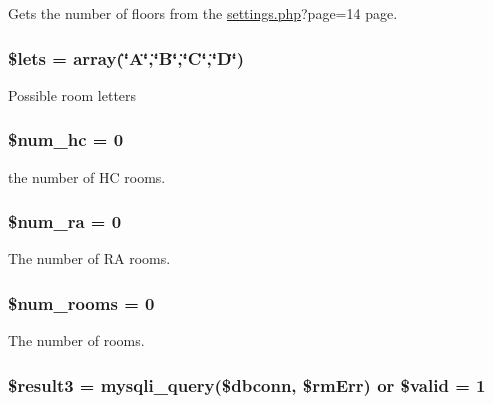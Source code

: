 \-Gets the number of floors from the \hyperlink{settings_8php}{settings.\-php}?page=14 page. \hypertarget{roomsVal_8php_a628d739f2a9b4e8ad7b45417ca5b0edd}{
\subsubsection[{\$lets}]{\setlength{\rightskip}{0pt plus 5cm}\$lets = array(\char`\"{}\-A\char`\"{},\char`\"{}\-B\char`\"{},\char`\"{}\-C\char`\"{},\char`\"{}\-D\char`\"{})}}\label{roomsVal_8php_a628d739f2a9b4e8ad7b45417ca5b0edd}
\-Possible room letters \hypertarget{roomsVal_8php_a0676c3aab4512e850c0778fdc42ea183}{
\subsubsection[{\$num\-\_\-hc}]{\setlength{\rightskip}{0pt plus 5cm}\$num\-\_\-hc = 0}}\label{roomsVal_8php_a0676c3aab4512e850c0778fdc42ea183}
the number of \-H\-C rooms. \hypertarget{roomsVal_8php_aaf1cd7ce3153edff129df3a57ab81c2f}{
\subsubsection[{\$num\-\_\-ra}]{\setlength{\rightskip}{0pt plus 5cm}\$num\-\_\-ra = 0}}\label{roomsVal_8php_aaf1cd7ce3153edff129df3a57ab81c2f}
\-The number of \-R\-A rooms. \hypertarget{roomsVal_8php_ad51cf907141b35051a8d4123b3e7e259}{
\subsubsection[{\$num\-\_\-rooms}]{\setlength{\rightskip}{0pt plus 5cm}\$num\-\_\-rooms = 0}}\label{roomsVal_8php_ad51cf907141b35051a8d4123b3e7e259}
\-The number of rooms. \hypertarget{roomsVal_8php_a3bed351c02cbc07bce580e0044c8d37d}{
\subsubsection[{\$result3}]{\setlength{\rightskip}{0pt plus 5cm}\$result3 = mysqli\-\_\-query(\$dbconn, \$rm\-Err) or \$valid = 1}}\label{roomsVal_8php_a3bed351c02cbc07bce580e0044c8d37d}
